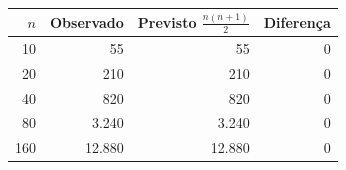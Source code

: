 \begin{tabular}{rrrr}
\toprule
$n$ & Observado & Previsto $\frac{n(n+1)}{2}$ & Diferença \\
\midrule
10 & 55 & 55 & 0 \\
20 & 210 & 210 & 0 \\
40 & 820 & 820 & 0 \\
80 & 3.240 & 3.240 & 0 \\
160 & 12.880 & 12.880 & 0 \\
\bottomrule
\end{tabular}

